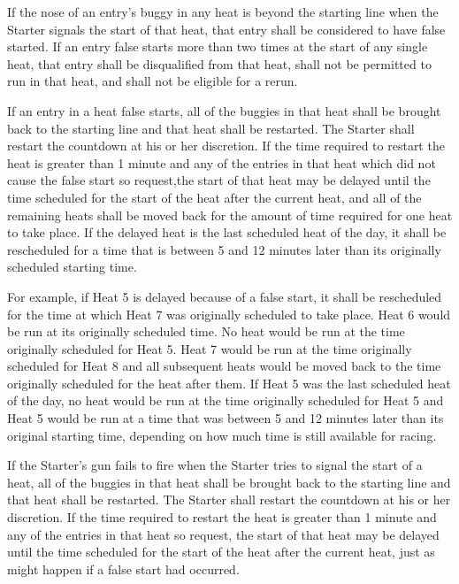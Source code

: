 	If the nose of an entry's buggy in any heat is beyond the starting line when
	the Starter signals the start of that heat, that entry shall be considered to
	have false started. If an entry false starts more than two times at the start
	of any single heat, that entry shall be disqualified from that heat, shall not
	be permitted to run in that heat, and shall not be eligible for a rerun.

	If an entry in a heat false starts, all of the buggies in that heat shall be
	brought back to the starting line and that heat shall be restarted. The Starter
	shall restart the countdown at his or her discretion. If the time required to
	restart the heat is greater than 1 minute and any of the entries in that heat
	which did not cause the false start so request,the start of that heat may be
	delayed until the time scheduled for the start of the heat after the current
	heat, and all of the remaining heats shall be moved back for the amount of time
	required for one heat to take place. If the delayed heat is the last scheduled
	heat of the day, it shall be rescheduled for a time that is between 5 and 12
	minutes later than its originally scheduled starting time.

	For example, if Heat 5 is delayed because of a false start, it shall be
	rescheduled for the time at which Heat 7 was originally scheduled to take
	place. Heat 6 would be run at its originally scheduled time. No heat would be
	run at the time originally scheduled for Heat 5. Heat 7 would be run at the
	time originally scheduled for Heat 8 and all subsequent heats would be moved
	back to the time originally scheduled for the heat after them. If Heat 5 was
	the last scheduled heat of the day, no heat would be run at the time originally
	scheduled for Heat 5 and Heat 5 would be run at a time that was between 5 and
	12 minutes later than its original starting time, depending on how much time is
	still available for racing.

	If the Starter's gun fails to fire when the Starter tries to signal the start
	of a heat, all of the buggies in that heat shall be brought back to the
	starting line and that heat shall be restarted. The Starter shall restart the
	countdown at his or her discretion. If the time required to restart the heat is
	greater than 1 minute and any of the entries in that heat so request, the start
	of that heat may be delayed until the time scheduled for the start of the heat
	after the current heat, just as might happen if a false start had occurred.

